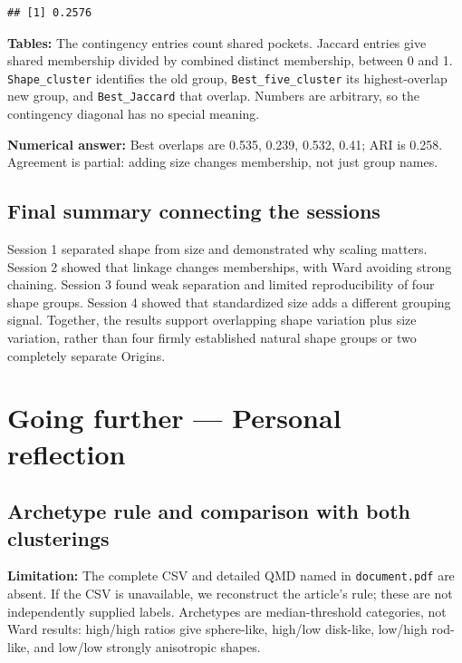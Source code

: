 \documentclass[
  10pt,
]{article}
\begin{document}
\begin{verbatim}
## [1] 0.2576
\end{verbatim}

\textbf{Tables:} The contingency entries count shared pockets. Jaccard
entries give shared membership divided by combined distinct membership,
between 0 and 1. \texttt{Shape\_cluster} identifies the old group,
\texttt{Best\_five\_cluster} its highest-overlap new group, and
\texttt{Best\_Jaccard} that overlap. Numbers are arbitrary, so the
contingency diagonal has no special meaning.

\textbf{Numerical answer:} Best overlaps are 0.535, 0.239, 0.532, 0.41;
ARI is 0.258. Agreement is partial: adding size changes membership, not
just group names.

\subsection{Final summary connecting the
sessions}\label{final-summary-connecting-the-sessions}

Session 1 separated shape from size and demonstrated why scaling
matters. Session 2 showed that linkage changes memberships, with Ward
avoiding strong chaining. Session 3 found weak separation and limited
reproducibility of four shape groups. Session 4 showed that standardized
size adds a different grouping signal. Together, the results support
overlapping shape variation plus size variation, rather than four firmly
established natural shape groups or two completely separate Origins.

\section{Going further --- Personal
reflection}\label{going-further-personal-reflection}

\subsection{Archetype rule and comparison with both
clusterings}\label{archetype-rule-and-comparison-with-both-clusterings}

\textbf{Limitation:} The complete CSV and detailed QMD named in
\texttt{document.pdf} are absent. If the CSV is unavailable, we
reconstruct the article's rule; these are not independently supplied
labels. Archetypes are median-threshold categories, not Ward results:
high/high ratios give sphere-like, high/low disk-like, low/high
rod-like, and low/low strongly anisotropic shapes.
\end{document}
